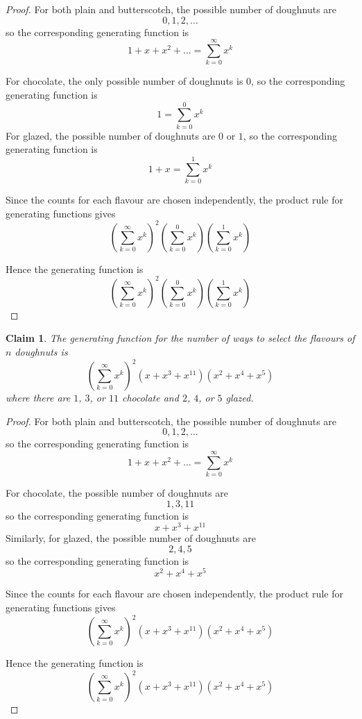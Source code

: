 \documentclass{article}
\newtheorem{claim}{Claim}
\begin{document}
\begin{proof}
    For both plain and butterscotch, the possible number of doughnuts are
    \[
    0, 1, 2, \dots
    \]
    so the corresponding generating function is
    \[
    1 + x + x^2 + \dots = \sum_{k=0}^{\infty}x^k
    \]

    \medskip

    For chocolate, the only possible number of doughnuts is $0$, so the corresponding
    generating function is
    \[
    1 = \sum_{k=0}^{0}x^k
    \]
    For glazed, the possible number of doughnuts are $0$ or $1$, so the corresponding
    generating function is
    \[
    1 + x = \sum_{k=0}^{1}x^k
    \]

    \medskip

    Since the counts for each flavour are chosen independently, the product rule for
    generating functions gives
    \[
    \left(\sum_{k=0}^{\infty}x^k\right)^2\left(\sum_{k=0}^{0}x^k\right)
    \left(\sum_{k=0}^{1}x^k\right)
    \]

    \medskip

    Hence the generating function is
    \[
    \left(\sum_{k=0}^{\infty}x^k\right)^2\left(\sum_{k=0}^{0}x^k\right)
    \left(\sum_{k=0}^{1}x^k\right)    
    \]
\end{proof}

\begin{claim}
    The generating function for the number of ways to select the flavours of $n$ doughnuts is 
    \[
    \left(\sum_{k=0}^{\infty}x^k\right)^2(x + x^3 + x^{11})(x^2 + x^4 + x^5)
    \]
    where there are $1$, $3$, or $11$ chocolate and $2$, $4$, or $5$ glazed.
\end{claim}

\begin{proof}
    For both plain and butterscotch, the possible number of doughnuts are
    \[
    0, 1, 2, \dots
    \]
    so the corresponding generating function is
    \[
    1 + x + x^2 + \dots = \sum_{k=0}^{\infty}x^k
    \]

    \medskip

    For chocolate, the possible number of doughnuts are
    \[
    1, 3, 11
    \]
    so the corresponding generating function is
    \[
    x + x^3 + x^{11}
    \]
    Similarly, for glazed, the possible number of doughnuts are
    \[
    2, 4, 5
    \]
    so the corresponding generating function is
    \[
    x^2 + x^4 + x^5
    \]

    \medskip

    Since the counts for each flavour are chosen independently, the product rule for
    generating functions gives
    \[
    \left(\sum_{k=0}^{\infty}x^k\right)^2(x + x^3 + x^{11})(x^2 + x^4 + x^5)
    \]

    \medskip

    Hence the generating function is
    \[
    \left(\sum_{k=0}^{\infty}x^k\right)^2(x + x^3 + x^{11})(x^2 + x^4 + x^5)
    \]
\end{proof}
\end{document}
